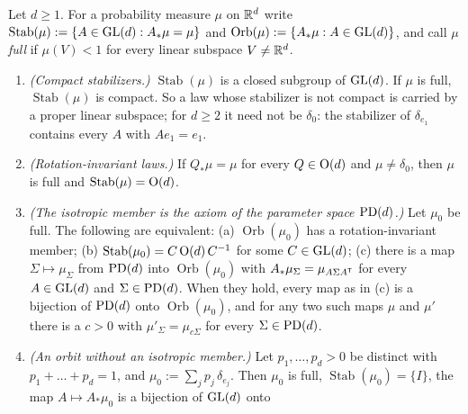 \begin{lemma}
\label{lem:parameter-space}
\leanok
Let $d \ge 1$. For a probability measure $\mu$ on $\mathbb{R}^d$ write
$\operatorname{Stab}(\mu) := \{A \in \mathrm{GL}(d) : A_*\mu = \mu\}$ and
$\operatorname{Orb}(\mu) := \{A_*\mu : A \in \mathrm{GL}(d)\}$, and call $\mu$ \emph{full} if
$\mu(V) < 1$ for every linear subspace $V \ne \mathbb{R}^d$.
\begin{enumerate}
\item \emph{(Compact stabilizers.)} $\operatorname{Stab}(\mu)$ is a closed subgroup of $\mathrm{GL}(d)$. If
$\mu$ is full, $\operatorname{Stab}(\mu)$ is compact. So a law whose stabilizer is not compact is
carried by a proper linear subspace; for $d \ge 2$ it need not be $\delta_0$: the stabilizer of
$\delta_{e_1}$ contains every $A$ with $Ae_1 = e_1$.
\item \emph{(Rotation-invariant laws.)} If $Q_*\mu = \mu$ for every $Q \in \mathrm{O}(d)$ and
$\mu \ne \delta_0$, then $\mu$ is full and $\operatorname{Stab}(\mu) = \mathrm{O}(d)$.
\item \emph{(The isotropic member is the axiom of the parameter space $\mathrm{PD}(d)$.)} Let $\mu_0$ be
full. The following are equivalent:
(a) $\operatorname{Orb}(\mu_0)$ has a rotation-invariant member;
(b) $\operatorname{Stab}(\mu_0) = C\,\mathrm{O}(d)\,C^{-1}$ for some $C \in \mathrm{GL}(d)$;
(c) there is a map $\Sigma \mapsto \mu_\Sigma$ from $\mathrm{PD}(d)$ into $\operatorname{Orb}(\mu_0)$ with
$A_*\mu_\Sigma = \mu_{A\Sigma A^{\mathsf{T}}}$ for every $A \in \mathrm{GL}(d)$ and $\Sigma \in \mathrm{PD}(d)$.
When they hold, every map as in (c) is a bijection of $\mathrm{PD}(d)$ onto $\operatorname{Orb}(\mu_0)$, and
for any two such maps $\mu$ and $\mu'$ there is a $c > 0$ with $\mu'_\Sigma = \mu_{c\Sigma}$ for
every $\Sigma \in \mathrm{PD}(d)$.
\item \emph{(An orbit without an isotropic member.)} Let $p_1, \dots, p_d > 0$ be distinct with
$p_1 + \dots + p_d = 1$, and $\mu_0 := \sum_jp_j\,\delta_{e_j}$. Then $\mu_0$ is full,
$\operatorname{Stab}(\mu_0) = \{I\}$, the map $A \mapsto A_*\mu_0$ is a bijection of $\mathrm{GL}(d)$ onto

\end{enumerate}
\end{lemma}
